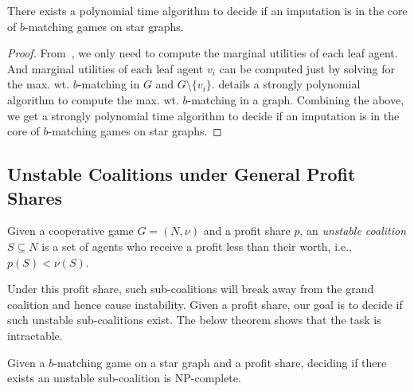 \begin{corollary}
\label{cr:imputation_star}
There exists a polynomial time algorithm to decide if an imputation is in the core of $b$-matching games on star graphs.
\end{corollary}

\begin{proof}
    From~, we only need to compute the marginal utilities of each leaf agent. And marginal utilities of each leaf agent $v_i$ can be computed just by solving for the max. wt. $b$-matching in $G$ and $G\setminus\{v_i\}$. \cite{Schrijver_book} details a strongly polynomial algorithm to compute the max. wt. $b$-matching in a graph. Combining the above, we get a strongly polynomial time algorithm to decide if an imputation is in the core of $b$-matching games on star graphs.
\end{proof}

\subsection{Unstable Coalitions under General Profit Shares}

\begin{definition}
    Given a cooperative game $G=(N,\nu)$ and a profit share $p$, an \textit{unstable coalition} $S\subseteq N$ is a set of agents who receive a profit less than their worth, i.e., $p(S)<\nu(S)$.
\end{definition}

Under this profit share, such sub-coalitions will break away from the grand coalition and hence cause instability. Given a profit share, our goal is to decide if such unstable sub-coalitions exist. The below theorem shows that the task is intractable.

\begin{theorem}
\label{thm:profit_share_for_star}
    Given a $b$-matching game on a star graph and a profit share, deciding if there exists an unstable sub-coalition is NP-complete.
\end{theorem}



